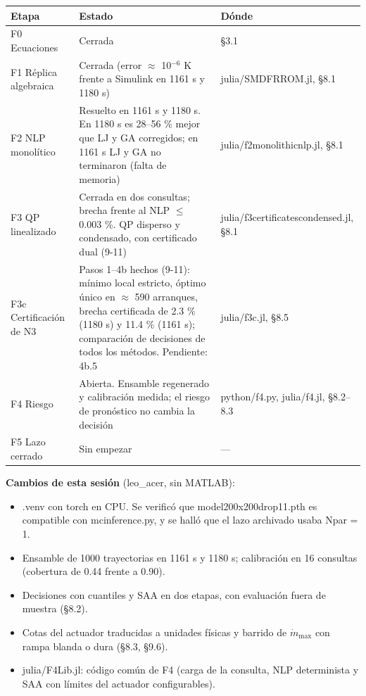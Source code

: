 \documentclass[11pt,a4paper]{article}
\newcommand{\codeus}{\textunderscore\allowbreak}
\newcommand{\code}[1]{{\small\ttfamily\let\_\codeus #1}}
\begin{document}
{\small
\begin{xltabular}{\linewidth}{@{}YYY@{}}
\toprule
\textbf{Etapa} & \textbf{Estado} & \textbf{Dónde} \\
\midrule
\endhead
F0 Ecuaciones & Cerrada & \S{}3.1 \\
F1 Réplica algebraica & Cerrada (error $\approx$ 10$^{-6}$ K frente a Simulink en 1161 s y 1180 s) & \code{julia/SMDFRROM.jl}, \S{}8.1 \\
F2 NLP monolítico & Resuelto en 1161 s y 1180 s. En 1180 s es 28–56 \% mejor que LJ y GA corregidos; en 1161 s LJ y GA no terminaron (falta de memoria) & \code{julia/f2\_monolithic\_nlp.jl}, \S{}8.1 \\
F3 QP linealizado & Cerrada en dos consultas; brecha frente al NLP $\le$ 0.003 \%. QP disperso y condensado, con certificado dual (9-11) & \code{julia/f3\_certificates\_condensed.jl}, \S{}8.1 \\
F3c Certificación de N3 & Pasos 1–4b hechos (9-11): mínimo local estricto, óptimo único en $\approx$ 590 arranques, brecha certificada de 2.3 \% (1180 s) y 11.4 \% (1161 s); comparación de decisiones de todos los métodos. Pendiente: 4b.5 & \code{julia/f3c\_*.jl}, \S{}8.5 \\
F4 Riesgo & Abierta. Ensamble regenerado y calibración medida; el riesgo de pronóstico no cambia la decisión & \code{python/f4\_*.py}, \code{julia/f4\_*.jl}, \S{}8.2–8.3 \\
F5 Lazo cerrado & Sin empezar & — \\
\bottomrule
\end{xltabular}}

\textbf{Cambios de esta sesión} (leo\_acer, sin MATLAB):

\begin{itemize}
\item \code{.venv} con \code{torch} en CPU. Se verificó que \code{model\_200x200\_drop1\_1.pth} es compatible con \code{mc\_inference.py}, y se halló que el lazo archivado usaba \code{N\_par = 1}.
\item Ensamble de 1000 trayectorias en 1161 s y 1180 s; calibración en 16 consultas (cobertura de 0.44 frente a 0.90).
\item Decisiones con cuantiles y SAA en dos etapas, con evaluación fuera de muestra (\S{}8.2).
\item Cotas del actuador traducidas a unidades físicas y barrido de $\dot m_{\max}$ con rampa blanda o dura (\S{}8.3, \S{}9.6).
\item \code{julia/F4Lib.jl}: código común de F4 (carga de la consulta, NLP determinista y SAA con límites del actuador configurables).
\end{itemize}
\end{document}

